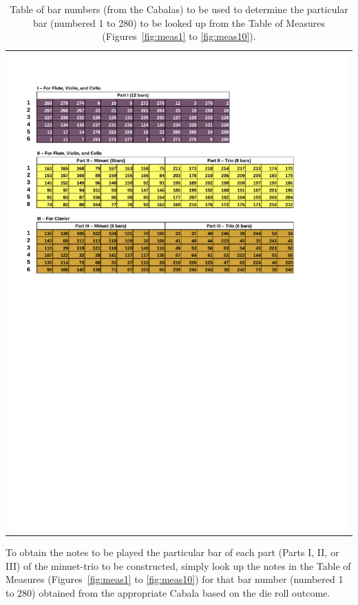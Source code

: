 \documentclass[a4paper,x11names,svgnames,10pt]{article}
\begin{document}
{	
\begin{table}[H]
	\centering
	\begin{tabular}{c}
		\centering
		\includegraphics[clip=true,trim=0.275in 6.275in 1.00in 0.775in,scale=0.90]{000tables}
	\end{tabular}
	\caption{Table of bar numbers (from the Cabalas) to be used to determine the particular bar (numbered 1 to 280) to be looked up from the Table of Measures (Figures~\ref{fig:meas1} to \ref{fig:meas10}).}
	\label{tab:tabNum}
\end{table}

To obtain the notes to be played the particular bar of each part (Parts I, II, or III) of the minuet-trio to be constructed, simply look up the notes in the Table of Measures (Figures~\ref{fig:meas1} to \ref{fig:meas10}) for that bar number (numbered 1 to 280) obtained from the appropriate Cabala based on the die roll outcome.

}
\end{document}
